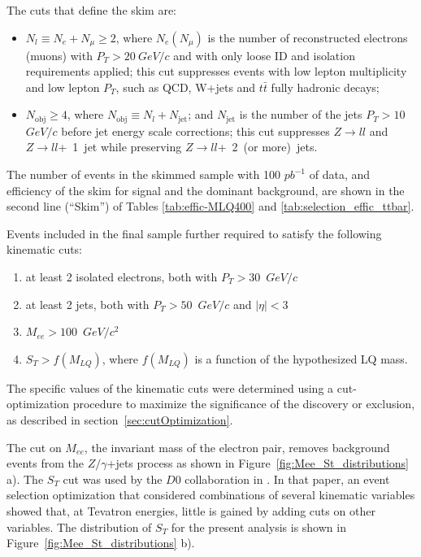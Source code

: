 \documentclass{cmspaper}
\begin{document}
\begin{linenumbers}
The cuts that define the skim  are:
\begin{itemize}
\item $N_l \equiv N_e + N_{\mu} \ge 2$, where $N_e (N_{\mu})$ is the number of reconstructed electrons (muons)
with $P_T>20~$$GeV/c$ and with only loose ID and isolation requirements 
applied; this cut suppresses events with low 
lepton multiplicity and low lepton $P_T$, such as QCD, W+jets and $t\bar{t}$ fully hadronic decays;
\item $N_{\mathrm{obj}} \ge 4$, where $N_{\mathrm{obj}} \equiv N_l + N_{\mathrm{jet}}$; and
$N_{\mathrm{jet}}$ is the number of the jets $P_T > 10~$$GeV/c$ before jet
energy scale corrections; this cut suppresses $Z \rightarrow ll$ and 
$Z \rightarrow ll$+~1~jet while preserving $Z \rightarrow ll$+~2~(or more)~jets.
\end{itemize}

The number of events in the skimmed sample with 100 $pb^{-1}$ of data, and 
efficiency of the skim for signal and the dominant background, are shown in the second line (``Skim'') 
of Tables
\ref{tab:effic-MLQ400} and 
\ref{tab:selection_effic_ttbar}.

Events included in the final sample further required to satisfy 
the following kinematic cuts:
%
\begin{enumerate}
\item at least 2 isolated electrons, both with $P_T>30$~$GeV/c$ 
\item at least 2 jets, both with $P_T>50$~$GeV/c$ and $|\eta|<3$
\item $M_{ee}>100$~$GeV/c^2$
\item $S_T>f(M_{LQ})$, where $f(M_{LQ})$ is a function 
of the hypothesized LQ mass.
\end{enumerate}
%

The specific values of the kinematic cuts were determined 
using a cut-optimization procedure to maximize the significance of
the discovery or exclusion, as described in section~\ref{sec:cutOptimization}.

The cut on $M_{ee}$, the invariant mass of the electron pair, 
removes background events from the
$Z/\gamma$+jets process as shown in Figure~\ref{fig:Mee_St_distributions} a).
The $S_T$ cut was used by the $D0$ collaboration in 
\cite{Abazov:2001mx}. In that paper, an event 
selection optimization that considered
combinations of several kinematic variables 
showed that, at Tevatron energies,  little is gained by 
adding cuts on other variables. The distribution of $S_T$ for the present
analysis is shown in Figure~\ref{fig:Mee_St_distributions} b).



\end{linenumbers}
\end{document}
